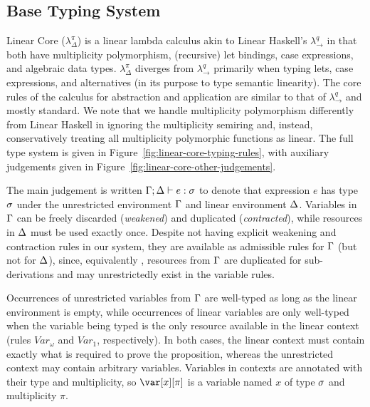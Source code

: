 \documentclass[acmsmall,review,anonymous,screen]{acmart}
\begin{document}
% 

\subsection{Base Typing System\label{sec:base-calculi}}

Linear Core ($\lambda^\pi_\Delta$) is a linear lambda calculus akin to Linear
Haskell's $\lambda^q_\to$ in that both have multiplicity polymorphism,
(recursive) let bindings, case expressions, and algebraic data types.
$\lambda^\pi_\Delta$ diverges from $\lambda^q_\to$ primarily when typing lets,
case expressions, and alternatives (in its purpose to type semantic linearity).
%
%
%
The core rules of the calculus for abstraction and application are similar to
that of $\lambda^q_\to$ and mostly standard. 
We note that we handle multiplicity polymorphism differently from
Linear Haskell in ignoring the multiplicity semiring and, instead,
conservatively treating all multiplicity polymorphic functions as linear.
%
The full type system is given in Figure~\ref{fig:linear-core-typing-rules},
with auxiliary judgements given in
Figure~\ref{fig:linear-core-other-judgements}.

\TypingRules
\TypingRulesOther

The main judgement is written $\Gamma;\Delta \vdash e : \sigma$ to denote that expression
$e$ has type $\sigma$ under the unrestricted environment $\Gamma$ and linear
environment $\Delta$.
%
%
Variables in $\Gamma$ can be freely discarded (\emph{weakened}) and duplicated
(\emph{contracted}), while resources in $\Delta$ must be used exactly once. Despite
not having explicit weakening and contraction rules in our system, they are
available as admissible rules for $\Gamma$ (but not for $\Delta$), since, equivalently
\cite{91621fae-5e53-3497-8291-32b2fab5a743}, resources from $\Gamma$ are duplicated
for sub-derivations and may unrestrictedly exist in the variable rules.
%

Occurrences of unrestricted variables from $\Gamma$ are well-typed as long as the linear
environment is empty, while occurrences of linear variables are only well-typed
when the variable being typed is the only resource available in the
linear context (rules $Var_\omega$ and $Var_1$, respectively).
In both cases, the linear context must contain exactly what is required to
prove the proposition, whereas the unrestricted context may contain arbitrary
variables.
%
Variables in contexts are annotated with their type and multiplicity, so
$\x[\pi]$ is a variable named $x$ of type $\sigma$ and multiplicity $\pi$.
\end{document}
